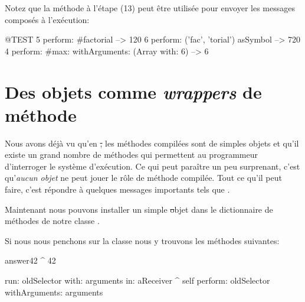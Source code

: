 \documentclass[a4paper,10pt,twoside]{book}
\begin{document}
Notez que la méthode  à l'étape (13) peut être utilisée pour envoyer les messages composés à l'exécution:
\begin{code}{@TEST}
5 perform: #factorial                                             --> 120
6 perform: ('fac', 'torial') asSymbol                       --> 720
4 perform: #max: withArguments: (Array with: 6) --> 6
\end{code}

\section{Des objets comme \emph{wrappers} de méthode}

Nous avons déjà vu qu'en \st, les méthodes compilées sont de simples objets et qu'il existe un grand nombre de méthodes qui permettent au programmeur d'interroger le système d'exécution.
Ce qui peut paraître un peu surprenant, c'est qu'\emph{aucun objet} ne peut jouer le rôle de méthode compilée. Tout ce qu'il peut faire, c'est répondre à quelques messages importants tels que .


Maintenant nous pouvons installer un simple \st objet
dans le dictionnaire de méthodes de notre classe .


Si nous nous penchons sur la classe  nous y trouvons les méthodes suivantes:
\begin{code}{}
answer42
	^ 42

run: oldSelector with: arguments in: aReceiver
	^ self perform: oldSelector withArguments: arguments
\end{code}
\end{document}
